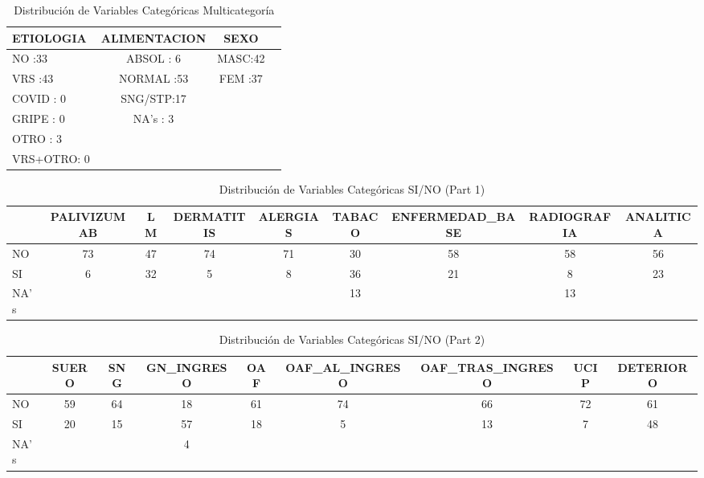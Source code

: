 \newpage
\thispagestyle{empty}
\begin{landscape}
\begin{table}[h]
    \centering
    \caption{Distribución de Variables Categóricas Multicategoría}
    \begin{tabular}{lccc}
    \hline
    ETIOLOGIA & ALIMENTACION & SEXO \\
    \hline
    NO      :33   & ABSOL  : 6    & MASC:42 \\
    VRS     :43   & NORMAL :53    & FEM :37 \\
    COVID   : 0   & SNG/STP:17    & \\
    GRIPE   : 0   & NA's   : 3    & \\
    OTRO    : 3   &                & \\
    VRS+OTRO: 0   &                & \\
    \hline
    \end{tabular}\label{tabla:distribucion_variables_categoricas_multicat}
\end{table}

\begin{table}[h]
    \centering
    \caption{Distribución de Variables Categóricas SI/NO (Part 1)}
    \begin{tabular}{lcccccccc}
    \hline
        ~ & PALIVIZUMAB & LM & DERMATITIS & ALERGIAS & TABACO & ENFERMEDAD\_BASE & RADIOGRAFIA & ANALITICA \\
        \hline
        NO & 73 & 47 & 74 & 71 & 30 & 58 & 58 & 56 \\
        SI & 6 & 32 & 5 & 8 & 36 & 21 & 8 & 23 \\
        NA's & ~ & ~ & ~ & ~ & 13 & ~ & 13 & ~ \\
        \hline
    \end{tabular}
    \label{tabla:distribucion_variables_categoricas_si_no_1}
\end{table}

\begin{table}[h]
    \centering
    \caption{Distribución de Variables Categóricas SI/NO (Part 2)}
    \begin{tabular}{lcccccccc}
    \hline
        ~ & SUERO & SNG & GN\_INGRESO & OAF & OAF\_AL\_INGRESO & OAF\_TRAS\_INGRESO & UCIP & DETERIORO \\
        \hline
        NO & 59 & 64 & 18 & 61 & 74 & 66 & 72 & 61 \\
        SI & 20 & 15 & 57 & 18 & 5 & 13 & 7 & 48 \\
        NA's & ~ & ~ & 4 & ~ & ~ & ~ & ~ & ~ \\
        \hline
    \end{tabular}
    \label{tabla:distribucion_variables_categoricas_si_no_2}
\end{table}


\end{landscape}
